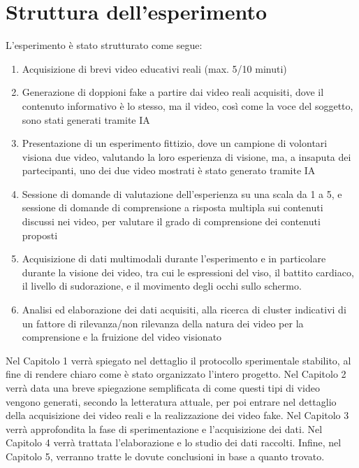\section*{Struttura dell'esperimento}

L'esperimento è stato strutturato come segue:
\begin{enumerate}
\item Acquisizione di brevi video educativi reali (max. 5/10 minuti)
\item Generazione di doppioni fake a partire dai video reali acquisiti, dove il contenuto informativo è lo stesso, ma il video, così come la voce del soggetto, sono stati generati tramite IA
\item Presentazione di un esperimento fittizio, dove un campione di volontari visiona due video, valutando la loro esperienza di visione, ma, a insaputa dei partecipanti, uno dei due video mostrati è stato generato tramite IA
\item Sessione di domande di valutazione dell'esperienza su una scala da 1 a 5, e sessione di domande di comprensione a risposta multipla sui contenuti discussi nei video, per valutare il grado di comprensione dei contenuti proposti
\item Acquisizione di dati multimodali durante l'esperimento e in particolare durante la visione dei video, tra cui le espressioni del viso, il battito cardiaco, il livello di sudorazione, e il movimento degli occhi sullo schermo.
\item Analisi ed elaborazione dei dati acquisiti, alla ricerca di cluster indicativi di un fattore di rilevanza/non rilevanza della natura dei video per la comprensione e la fruizione del video visionato
\end{enumerate}

Nel Capitolo 1 verrà spiegato nel dettaglio il protocollo sperimentale stabilito, al fine di rendere chiaro come è stato organizzato l'intero progetto. Nel Capitolo 2 verrà data una breve spiegazione semplificata di come questi tipi di video vengono generati, secondo la letteratura attuale, per poi entrare nel dettaglio della acquisizione dei video reali e la realizzazione dei video fake. Nel Capitolo 3 verrà approfondita la fase di sperimentazione e l'acquisizione dei dati. Nel Capitolo 4 verrà trattata l'elaborazione e lo studio dei dati raccolti. Infine, nel Capitolo 5, verranno tratte le dovute conclusioni in base a quanto trovato.

\clearpage